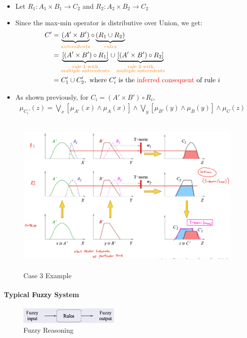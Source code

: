 \documentclass{tron}
\begin{document}
\begin{itemize}
	\item Let $R_1: A_1 \times B_1 \rightarrow C_2$ and $R_2: A_2 \times B_2 \rightarrow C_2$ 
	\item Since the max-min operator is distributive over Union, we get:
	\begin{align}
		C' 	&= \underbrace{(A' \times B')}_{{\color{orange}antecedents}}\circ \underbrace{(R_1 \cup R_2)}_{{\color{orange}rules}} \\
			&= \underbrace{[(A' \times B')\circ R_1]}_{{\color{orange}\substack{\text{rule 1 with} \\ \text{multiple antecedents}}}} \cup \underbrace{ [(A' \times B')\circ R_2]}_{{\color{orange}\substack{\text{rule 2 with} \\ \text{multiple antecedents}}}} \\
			&= C_1' \cup C_2', \text{ where $C_i'$ is the \textcolor{red}{inferred consequent} of rule $i$}
	\end{align}
	\item As shown previously, for $C_i = (A' \times B') \circ R_i$,
	\begin{align}
			\mu_{C_i'}(z) = \underset{x}{\bigvee} [\mu_{A'}(x) \land \mu_{A}(x)] \land \underset{y}{\bigvee} [\mu_{B'}(y) \land \mu_B(y)] \land \mu_C(z)
	\end{align}
\end{itemize}
\begin{figure}[H]
	\centering
	\includegraphics[height=300px]{Figs/FuzzyInferencing/case3}
	\caption{Case 3 Example}
	\label{fig:fuzzy-inf:case3:ex}
\end{figure}

\paragraph{Typical Fuzzy System}
\begin{figure}[H]
	\centering
	\includegraphics[height=30px]{Figs/FuzzyInferencing/fuzzy-sys}
	\caption{Fuzzy Reasoning}
	\label{fig:fuzzy-inf:system}
\end{figure}
\end{document}
